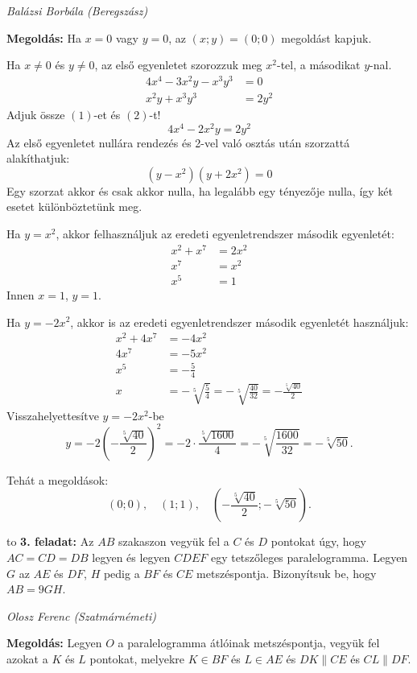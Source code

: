 \documentclass[a4paper,10pt]{article}
\newcommand{\ki}[2]{\hfill {\it #1 (#2)}\medskip}
\newcommand{\vonal}{\hbox to \hsize{\hskip2truecm\hrulefill\hskip2truecm}}
\begin{document}
\ki{Balázsi Borbála}{Beregszász}\medskip

{\bf Megoldás: } Ha $x=0$ vagy $y=0$, az $(x;y)=(0;0)$ megoldást kapjuk.

Ha $x\ne0$ és $y\ne0$, az első egyenletet szorozzuk meg $x^2$-tel, a másodikat $y$-nal.
\begin{align*}
4x^4-3x^2y-x^3y^3&= 0 \\
x^2y+x^3y^3&= 2y^2 
\end{align*}
Adjuk össze $(1)$-et és $(2)$-t!
\[4x^4-2x^2y= 2y^2\]
Az első egyenletet nullára rendezés és 2-vel való osztás után szorzattá alakíthatjuk:
\[\left(y-x^2\right)\left(y+2x^2\right)= 0\]
Egy szorzat akkor és csak akkor nulla, ha legalább egy tényezője nulla, így két esetet különböz\-te\-tünk meg.

Ha $y=x^2$, akkor felhasználjuk az eredeti egyenletrendszer második egyenletét:
\begin{align*}
x^2+x^7&=2x^2\\
x^7&=x^2\\
x^5&=1
\end{align*}
Innen $x=1$, $y=1$.

Ha $y=-2x^2$, akkor is az eredeti egyenletrendszer második egyenletét használjuk:
\begin{align*}
x^2+4x^7&=-4x^2\\
4x^7&=-5x^2\\
x^5&=-\frac54\\
x&=-\sqrt[5]{\frac54}=-\sqrt[5]{\frac{40}{32}}=-\frac{\sqrt[5]{40}}{2}
\end{align*}
Visszahelyettesítve $y=-2x^2$-be
\[y=-2\left(-\frac{\sqrt[5]{40}}{2}\right)^2=-2\cdot\frac{\sqrt[5]{1600}}{4}=-\sqrt[5]{\frac{1600}{32}}=-\sqrt[5]{50}.\]

Tehát a megoldások:
\[(0;0), \quad (1;1), \quad \left(-\frac{\sqrt[5]{40}}{2};-\sqrt[5]{50}\right).\]

\medskip


\vonal
{\bf 3. feladat: } 
Az $AB$ szakaszon vegyük fel a $C$ és $D$ pontokat úgy, hogy $AC=CD=DB$ legyen és legyen $CDEF$ egy tetszőleges  paralelogramma. Legyen $G$ az $AE$ és $DF$, $H$ pedig a $BF$ és $CE$ metszéspontja. Bizonyítsuk be, hogy $AB=9GH$.

\ki{Olosz Ferenc}{Szatmárnémeti}\medskip

{\bf Megoldás: } 
Legyen $O$ a paralelogramma átlóinak metszéspontja, vegyük fel azokat a $K$ és $L$ pontokat, melyekre $K\in BF$ és $L\in AE$ és $DK\parallel CE$ és $CL\parallel DF$.
\end{document}
